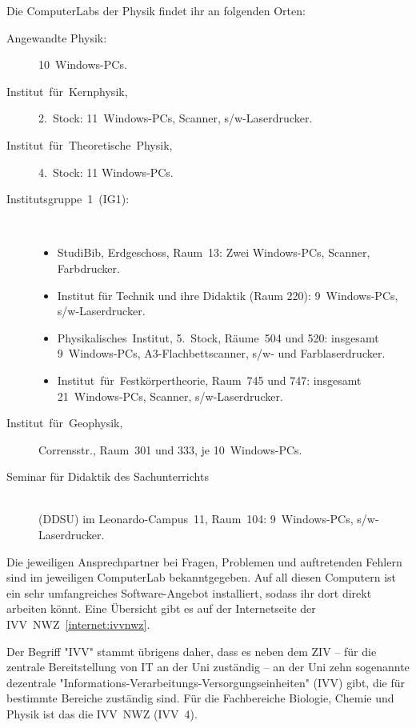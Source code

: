 \begin{multicols*}{2}
Die ComputerLabs der Physik findet ihr an folgenden Orten:
\begin{description}
	\item[Angewandte Physik:] 10~Windows-PCs.
	\item[Institut~für~Kernphysik,] 2.~Stock: 11~Windows-PCs, Scanner, s/w-Laserdrucker.
	\item[Institut~für~Theoretische~Physik,] 4.~Stock: 11 Windows-PCs.
	\item[Institutsgruppe~1~(IG1):]~
		\begin{itemize}[leftmargin=1mm]
			\item StudiBib, Erdgeschoss, Raum~13: Zwei Windows-PCs, Scanner, Farbdrucker.
			\item Institut für Technik und ihre Didaktik (Raum 220): 9~Windows-PCs, s/w-Laserdrucker.
			\item Physikalisches~Institut, 5.~Stock, Räume~504 und 520: insgesamt 9~Windows-PCs, A3-Flachbettscanner, s/w- und Farblaserdrucker.
			\item Institut~für~Festkörpertheorie, Raum~745 und 747: insgesamt 21~Windows-PCs, Scanner, s/w-Laserdrucker.
		\end{itemize}
	\item[Institut~für~Geophysik,] Corrensstr., Raum~301 und 333, je 10~Windows-PCs.
	\item[Seminar für Didaktik des Sachunterrichts]~\\(DDSU) im Leonardo-Campus~11, Raum~104: 9~Windows-PCs, s/w-Laserdrucker.
\end{description}

Die jeweiligen Ansprechpartner bei Fragen, Problemen und auftretenden Fehlern sind im jeweiligen ComputerLab bekanntgegeben.
Auf all diesen Computern ist ein sehr umfangreiches Software-Angebot installiert, sodass ihr dort direkt arbeiten könnt.
Eine Übersicht gibt es auf der Internetseite der IVV~NWZ~\cref{internet:ivvnwz}.

Der Begriff "IVV" stammt übrigens daher, dass es neben dem ZIV -- für die zentrale Bereitstellung von IT an der Uni zuständig -- an der Uni zehn sogenannte dezentrale "Informations-Verarbeitungs-Versorgungseinheiten" (IVV) gibt, die für bestimmte Bereiche zuständig sind.
Für die Fachbereiche Biologie, Chemie und Physik ist das die IVV~NWZ (IVV~4).



\end{multicols*}
